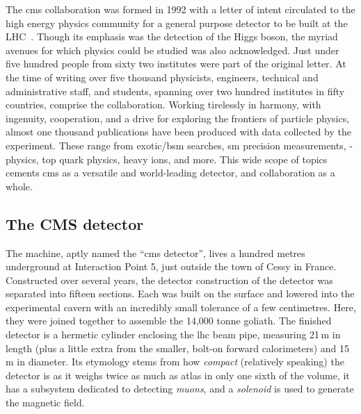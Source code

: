 The \acrfull{cms} collaboration was formed in 1992 with a letter of intent circulated to the high energy physics community for a general purpose detector to be built at the LHC~\cite{DellaNegra:290808}. Though its emphasis was the detection of the Higgs boson, the myriad avenues for which physics could be studied was also acknowledged. Just under five hundred people from sixty two institutes were part of the original letter. At the time of writing over five thousand physicists, engineers, technical and administrative staff, and students, spanning over two hundred institutes in fifty countries, comprise the collaboration. Working tirelessly in harmony, with ingenuity, cooperation, and a drive for exploring the frontiers of particle physics, almost one thousand publications have been produced with data collected by the experiment. These range from exotic/\acrshort{bsm} searches, \acrlong{sm} precision measurements, \PB-physics, top quark physics, heavy ions, and more. This wide scope of topics cements \acrshort{cms} as a versatile and world-leading detector, and collaboration as a whole.





\subsection{The CMS detector}
\label{subsec:cms_detector_itself}

The machine, aptly named the ``\acrshort{cms} detector'', lives a hundred metres underground at Interaction Point 5, just outside the town of Cessy in France. Constructed over several years, the detector construction of the detector was separated into fifteen sections. Each was built on the surface and lowered into the experimental cavern with an incredibly small tolerance of a few centimetres. Here, they were joined together to assemble the 14,000 tonne goliath. The finished detector is a hermetic cylinder enclosing the \acrshort{lhc} beam pipe, measuring 21\,m in length (plus a little extra from the smaller, bolt-on forward calorimeters) and 15\,m in diameter. Its etymology stems from how \emph{compact} (relatively speaking) the detector is as it weighs twice as much as \acrshort{atlas} in only one sixth of the volume, it has a subsystem dedicated to detecting \emph{muons}, and a \emph{solenoid} is used to generate the magnetic field.

